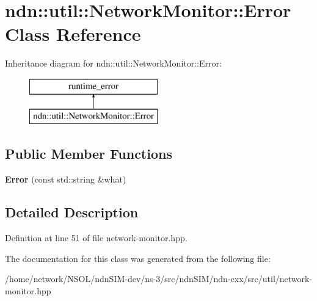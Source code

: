 \hypertarget{classndn_1_1util_1_1NetworkMonitor_1_1Error}{}\section{ndn\+:\+:util\+:\+:Network\+Monitor\+:\+:Error Class Reference}
\label{classndn_1_1util_1_1NetworkMonitor_1_1Error}
Inheritance diagram for ndn\+:\+:util\+:\+:Network\+Monitor\+:\+:Error\+:\begin{figure}[H]
\begin{center}
\leavevmode
\includegraphics[height=2.000000cm]{classndn_1_1util_1_1NetworkMonitor_1_1Error}
\end{center}
\end{figure}
\subsection*{Public Member Functions}
\begin{DoxyCompactItemize}
\item 
{\bfseries Error} (const std\+::string \&what)\hypertarget{classndn_1_1util_1_1NetworkMonitor_1_1Error_aac48032e4204de14209a59bd9923d9f8}{}\label{classndn_1_1util_1_1NetworkMonitor_1_1Error_aac48032e4204de14209a59bd9923d9f8}

\end{DoxyCompactItemize}


\subsection{Detailed Description}


Definition at line 51 of file network-\/monitor.\+hpp.



The documentation for this class was generated from the following file\+:\begin{DoxyCompactItemize}
\item 
/home/network/\+N\+S\+O\+L/ndn\+S\+I\+M-\/dev/ns-\/3/src/ndn\+S\+I\+M/ndn-\/cxx/src/util/network-\/monitor.\+hpp\end{DoxyCompactItemize}
